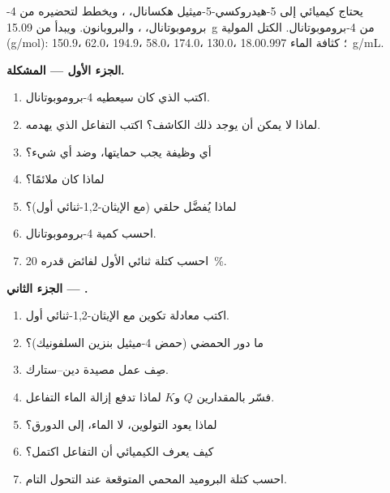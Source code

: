\begin{problem}
\label{pb:b1:acetals-protection:1}
يحتاج كيميائي إلى 5-هيدروكسي-5-ميثيل هكسانال، ،
ويخطط لتحضيره من 4-بروموبوتانال، ، والبروبانون.
ويبدأ من \qty{15.09}{g} من 4-بروموبوتانال. الكتل المولية
(\unit{g/mol}):  150.9،  62.0،  194.9،
 58.0،  174.0،  130.0،  18.0؛
كثافة الماء \qty{0.997}{g/mL}.

\medskip
\noindent\textbf{الجزء الأول --- المشكلة.}
\begin{enumerate}
  \item اكتب  الذي كان سيعطيه 4-بروموبوتانال.
  \item لماذا لا يمكن أن يوجد ذلك الكاشف؟ اكتب التفاعل الذي
        يهدمه.
  \item أي وظيفة يجب حمايتها، وضد أي شيء؟
  \item لماذا كان  ملائمًا؟
  \item لماذا يُفضَّل  حلقي (مع الإيثان-1,2-ثنائي أول)؟
  \item احسب كمية 4-بروموبوتانال.
  \item احسب كتلة ثنائي الأول لفائض قدره \qty{20}{\percent}.
\end{enumerate}

\medskip
\noindent\textbf{الجزء الثاني --- .}
\begin{enumerate}[resume]
  \item اكتب معادلة تكوين  مع الإيثان-1,2-ثنائي أول.
  \item ما دور  الحمضي (حمض 4-ميثيل بنزين
        السلفونيك)؟
  \item صِف عمل مصيدة دين--ستارك.
  \item فسّر بالمقدارين $Q$ و$K$ لماذا تدفع إزالة الماء التفاعل.
  \item لماذا يعود التولوين، لا الماء، إلى الدورق؟
  \item كيف يعرف الكيميائي أن التفاعل اكتمل؟
  \item احسب كتلة البروميد المحمي المتوقعة عند التحول التام.
\end{enumerate}


\end{problem}
